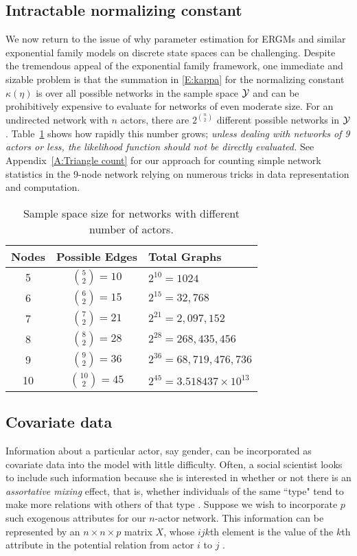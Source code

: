 \subsection{Intractable normalizing constant} \label{S:intractable}
We now return to the issue of why parameter estimation for ERGMs and 
similar exponential family models on discrete state spaces can be challenging.
Despite the tremendous appeal of the exponential family framework, one 
immediate and sizable problem is that the summation in \eqref{E:kappa} for the 
normalizing constant $\kappa(\eta)$ is over all possible 
networks in the sample space ${\mathcal Y}$ and can be prohibitively expensive to 
evaluate for networks of even moderate size.
For an undirected network with $n$ actors, there are $2^{{n\choose 2} }$ 
different possible networks in ${\mathcal Y}$.  Table~\ref{T:number graphs} shows how rapidly this number grows; 
\emph{unless dealing with networks of 9 actors or less, the likelihood function 
should not be directly evaluated.}  See Appendix~\ref{A:Triangle count}
for our approach for counting simple network statistics in the 9-node network
relying on numerous tricks in data representation and computation.

\begin{table}[h] 
\caption{Sample space size for networks with different number of actors.}
\begin{tabular}{ccl} 
\hline 
Nodes & Possible Edges & Total Graphs \\ [1ex]
\hline
5 & ${5 \choose 2} = 10$ & $2^{10} = 1024$ \\ [1ex]
6 & ${6 \choose 2} = 15$ & $2^{15} = 32,768$ \\ [1ex]
7 & ${7 \choose 2} = 21$ & $2^{21} = 2,097,152$ \\ [1ex]
8 & ${8 \choose 2} = 28$ & $2^{28} = 268,435,456$ \\ [1ex]
9 & ${9 \choose 2} = 36$ & $2^{36} = 68,719,476,736$ \\ [1ex]
10 & ${10 \choose 2} = 45$ & $2^{45} = 3.518437\times10^{13}$ \\ [1ex]
\hline 
\end{tabular} \label{T:number graphs}
\end{table}

\subsection{Covariate data} \label{S:Covariate}
Information about a particular actor, say gender, can be incorporated as 
covariate data into the model with little difficulty.
Often, a social scientist looks to include such information because she is interested in
whether or not there is an \emph{assortative mixing} effect, that is, whether individuals of the same ``type" tend to make more relations with others of that type \citep{Goodreau:2009}.  
Suppose we wish to incorporate $p$ such exogenous attributes for our $n$-actor network.  
This information can be represented by an $n \times n \times p$ matrix $X$, whose 
$ijk$th element is the value of the $k$th attribute in the potential relation from actor
$i$ to $j$ \citep*{Fienberg:1981,ergm}.  

